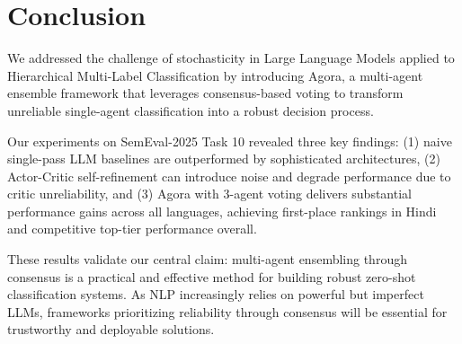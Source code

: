 \section{Conclusion}

We addressed the challenge of stochasticity in Large Language Models applied to Hierarchical Multi-Label Classification by introducing Agora, a multi-agent ensemble framework that leverages consensus-based voting to transform unreliable single-agent classification into a robust decision process.

Our experiments on SemEval-2025 Task 10 revealed three key findings: (1) naive single-pass LLM baselines are outperformed by sophisticated architectures, (2) Actor-Critic self-refinement can introduce noise and degrade performance due to critic unreliability, and (3) Agora with 3-agent voting delivers substantial performance gains across all languages, achieving first-place rankings in Hindi and competitive top-tier performance overall.

These results validate our central claim: multi-agent ensembling through consensus is a practical and effective method for building robust zero-shot classification systems. As NLP increasingly relies on powerful but imperfect LLMs, frameworks prioritizing reliability through consensus will be essential for trustworthy and deployable solutions.